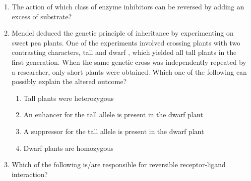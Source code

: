 \documentclass[journal,12pt,onecolumn]{IEEEtran}
\theoremstyle{remark}
\begin{document}
\begin{enumerate}
    \item The action of which class of enzyme inhibitors can be reversed by adding an excess of substrate?

    \hfill{}
    \begin{enumerate}
    \end{enumerate}

    \item Mendel deduced the genetic principle of inheritance by experimenting on sweet pea plants. One of the experiments involved crossing plants with two contrasting characters, tall  and dwarf , which yielded all tall plants in the first generation. When the same genetic cross was independently repeated by a researcher, only short plants were obtained. Which one of the following can possibly explain the altered outcome?

    \hfill{}
    \begin{enumerate}
        \item Tall plants were heterozygous
        \item An enhancer for the tall allele is present in the dwarf plant
        \item A suppressor for the tall allele is present in the dwarf plant
        \item Dwarf plants are homozygous
    \end{enumerate}

    \item Which of the following is/are responsible for reversible receptor-ligand interaction?

    \hfill{}
    \begin{enumerate}
    \end{enumerate}


\end{enumerate}
\end{document}
